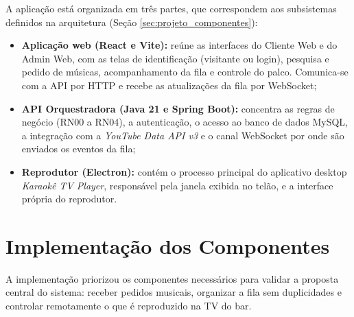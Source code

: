 A aplicação está organizada em três partes, que correspondem aos subsistemas definidos na arquitetura (Seção \ref{sec:projeto_componentes}):

\begin{itemize}
  \item \textbf{Aplicação web (React e Vite):} reúne as interfaces do Cliente Web e do Admin Web, com as telas de identificação (visitante ou login), pesquisa e pedido de músicas, acompanhamento da fila e controle do palco. Comunica-se com a API por HTTP e recebe as atualizações da fila por WebSocket;
  \item \textbf{API Orquestradora (Java 21 e Spring Boot):} concentra as regras de negócio (RN00 a RN04), a autenticação, o acesso ao banco de dados MySQL, a integração com a \textit{YouTube Data API v3} e o canal WebSocket por onde são enviados os eventos da fila;
  \item \textbf{Reprodutor (Electron):} contém o processo principal do aplicativo desktop \textit{Karaokê TV Player}, responsável pela janela exibida no telão, e a interface própria do reprodutor.
\end{itemize}

\section{Implementação dos Componentes}

A implementação priorizou os componentes necessários para validar a proposta central do sistema: receber pedidos musicais, organizar a fila sem duplicidades e controlar remotamente o que é reproduzido na TV do bar.


